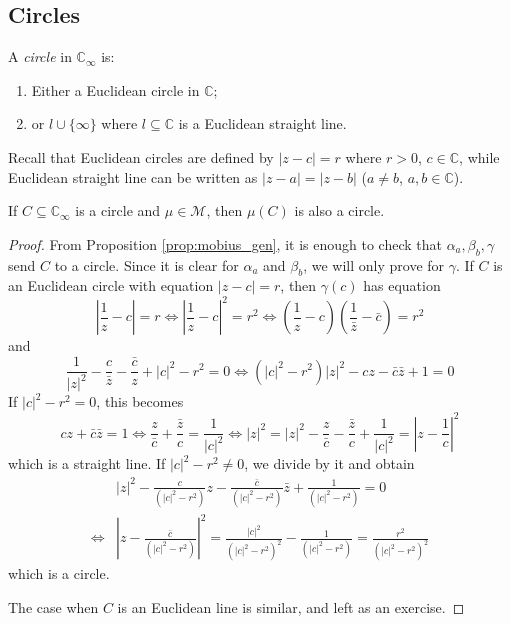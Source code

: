 \documentclass[10pt, a4paper, twoside]{report}
\begin{document}
\subsection{Circles}
\begin{definition}
    A \emph{circle} in \(\mathbb{C}_\infty\) is:
    \begin{enumerate}
        \item Either a Euclidean circle in \(\mathbb{C}\);
        \item or \(l\cup\{\infty\}\) where \(l\subseteq\mathbb{C}\) is a Euclidean straight line.
    \end{enumerate}
\end{definition}
Recall that Euclidean circles are defined by \(|z-c|=r\) where \(r>0\), \(c\in\mathbb{C}\), while Euclidean straight line can be written as \(|z-a|=|z-b|\) (\(a\neq b\), \(a,b\in\mathbb{C}\)).
\begin{theorem}
    If \(C\subseteq\mathbb{C}_\infty\) is a circle and \(\mu\in\mathcal{M}\), then \(\mu(C)\) is also a circle.
\end{theorem}
\begin{proof}
    From Proposition \ref{prop:mobius_gen}, it is enough to check that \(\alpha_a,\beta_b,\gamma\) send \(C\) to a circle. Since it is clear for \(\alpha_a\) and \(\beta_b\), we will only prove for \(\gamma\). If \(C\) is an Euclidean circle with equation \(|z-c|=r\), then \(\gamma(c)\) has equation 
    \[\left|\frac 1z-c\right|=r\Leftrightarrow\left|\frac 1z-c\right|^2=r^2\Leftrightarrow\left(\frac 1z-c\right)\left(\frac 1{\bar{z}}-\bar{c}\right)=r^2\]
    and 
    \[\frac 1{|z|^2}-\frac{c}{\bar{z}}-\frac{\bar{c}}{z}+|c|^2-r^2=0\Leftrightarrow(|c|^2-r^2)|z|^2-cz-\bar{c}\bar{z}+1=0\]
    If \(|c|^2-r^2= 0\), this becomes 
    \[cz+\bar{c}\bar{z}=1\Leftrightarrow\frac{z}{\bar{c}}+\frac{\bar{z}}{c}=\frac{1}{|c|^2}\Leftrightarrow |z|^2=|z|^2-\frac{z}{\bar{c}}-\frac{\bar{z}}{c}+\frac{1}{|c|^2}=\left|z-\frac 1c\right|^2\]
    which is a straight line. If \(|c|^2-r^2\neq 0\), we divide by it and obtain 
    \begin{align*}
        &|z|^2-\frac{c}{(|c|^2-r^2)}z-\frac{\bar{c}}{(|c|^2-r^2)}\bar{z}+\frac{1}{(|c|^2-r^2)}=0 \\
        \Leftrightarrow&\left|z-\frac{\bar{c}}{(|c|^2-r^2)}\right|^2=\frac{|c|^2}{(|c|^2-r^2)^2}-\frac{1}{(|c|^2-r^2)}=\frac{r^2}{(|c|^2-r^2)^2}
    \end{align*}
    which is a circle.

    The case when \(C\) is an Euclidean line is similar, and left as an exercise.
\end{proof}
\end{document}
